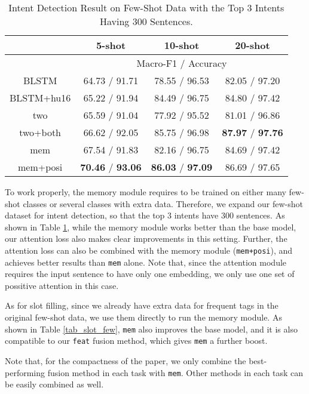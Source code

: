 \begin{table}
\setlength{\tabcolsep}{0.23em}
\centering
\small{
\begin{tabular}{|c|c|c|c|}

\hline
  & \multicolumn{1}{|c|}{5-shot} & \multicolumn{1}{|c|}{10-shot} & \multicolumn{1}{|c|}{20-shot}  \\
 \hline
  & \multicolumn{3}{|c|}{Macro-F1 / Accuracy}   \\
\hline
BLSTM & 64.73 / 91.71 & 78.55 / 96.53 & 82.05 / 97.20 \\
\hline
BLSTM+hu16 & 65.22 / 91.94 & 84.49 / 96.75 & 84.80 / 97.42 \\
\hline
two & 65.59 / 91.04 & 77.92 / 95.52 & 81.01 / 96.86 \\
\hline
two+both & 66.62 / 92.05 & 85.75 / 96.98 & \textbf{87.97} / \textbf{97.76} \\
\hline
mem & 67.54 / 91.83 & 82.16 / 96.75 & 84.69 / 97.42 \\
\hline
mem+posi & \textbf{70.46} / \textbf{93.06} & \textbf{86.03} / \textbf{97.09} & 86.69 / 97.65 \\
\hline

\end{tabular}
}
\caption{Intent Detection Result on Few-Shot Data with the Top 3 Intents Having 300 Sentences.}
\label{tab_intent_few_fill}
\end{table}

To work properly, the memory module requires to be trained on either many few-shot classes or several classes with extra data.
Therefore, we expand our few-shot dataset for intent detection, so that the top 3 intents have 300 sentences. 
As shown in Table \ref{tab_intent_few_fill}, while the memory module works better than the base model, our attention loss also makes clear improvements in this setting. 
Further, the attention loss can also be combined with the memory module (\texttt{mem+posi}), and achieves better results than \texttt{mem} alone. 
Note that, since the attention module requires the input sentence to have only one embedding, we only use one set of possitive attention in this case.

As for slot filling, since we already have extra data for frequent tags in the original few-shot data, we use them directly to run the memory module. As shown in Table \ref{tab_slot_few}, \texttt{mem} also improves the base model, and it is also compatible to our \texttt{feat} fusion method, which gives \texttt{mem} a further boost.

Note that, for the compactness of the paper, we only combine the best-performing fusion method in each task with \texttt{mem}. Other methods in each task can be easily combined as well. 

